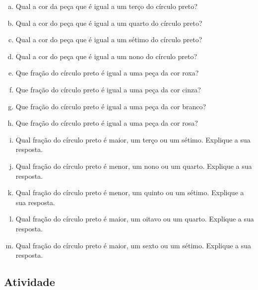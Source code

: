 \documentclass[a4,12pt]{book}
\begin{document}
\begin{enumerate}[a)]
   \item  Qual a cor da peça que é igual a um terço do círculo preto?
  \item  Qual a cor do peça que é igual a um quarto do círculo preto?
  \item  Qual a cor do peça que é igual a um sétimo do círculo preto?
  \item  Qual a cor do peça que é igual a um nono do círculo preto?
  \item  Que fração do círculo preto é igual a uma peça da cor roxa?
  \item  Que fração do círculo preto é igual a uma peça da cor cinza?
  \item  Que fração do círculo preto é igual a uma peça da cor branco?
  \item  Que fração do círculo preto é igual a uma peça da cor rosa?
  \item  Qual fração do círculo preto é maior, um terço ou um sétimo. Explique a sua resposta.
  \item  Qual fração do círculo preto é menor, um nono ou um quarto. Explique a sua resposta.
  \item  Qual fração do círculo preto é menor, um quinto ou um sétimo. Explique a sua resposta.
  \item  Qual fração do círculo preto é maior, um oitavo ou um quarto. Explique a sua resposta.
  \item  Qual fração do círculo preto é maior, um sexto ou um sétimo. Explique a sua resposta.
\end{enumerate}

\subsection{Atividade}
\end{document}

